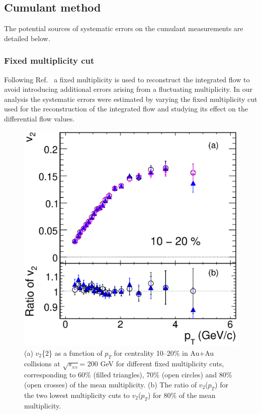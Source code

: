 \documentclass[aps,prc,superscriptaddress,showpacs,floatfix,twocolumn]{revtex4}
\newcommand \pt{\mbox{$p_T$}\xspace}
\newcommand \sqsn{\mbox{$\sqrt{s_{_{NN}}}$}\xspace}
\newcommand \Au{{Au+Au}\xspace}
\begin{document}
\subsection{Cumulant method \label{subsec:syserror_cumulantmethod}}
The potential sources of systematic errors on the cumulant 
measurements are detailed below.

\subsubsection{Fixed multiplicity cut}
Following Ref.~\cite{Borghini:2001vi} a fixed multiplicity is 
used to reconstruct the integrated flow to avoid introducing 
additional errors arising from a fluctuating multiplicity. In 
our analysis the systematic errors were estimated by varying the 
fixed multiplicity cut used for the reconstruction of the 
integrated flow and studying its effect on the differential flow 
values.

\begin{figure}[hbt]
\begin{center}
\includegraphics[width=1.0\linewidth]{v2-and-ratio-multcuts-10-20.eps}
\caption{\label{v2multcuts}
(a)  $v_{2}$\{2\} as a function of \pt for centrality 10--20$\%$ in \Au 
collisions at \sqsn = 200 GeV for different fixed multiplicity cuts, 
corresponding to 60\% (filled triangles), 70\% (open circles) and 80\% 
(open crosses) of the mean multiplicity.
(b) The ratio of $v_2$(\pt) for the two lowest multiplicity cuts to 
$v_2$(\pt) for 80\% of the mean multiplicity.
}
\end{center}
\end{figure}
\end{document}
